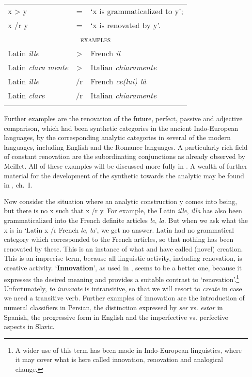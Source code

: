 \begin{table}
	\begin{tabular}{lcl}
		\lsptoprule
		x {\textgreater} y & = & ‘x is grammaticalized to y’;\\
		x /r y & = & ‘x is renovated by y’.\\
		\midrule
		\multicolumn{3}{c}{\textsc{examples}}\\
		Latin \textit{ille} &       {\textgreater} &  French \textit{il}\\
		Latin \textit{clara mente} & {\textgreater} &  Italian \textit{chiaramente}\\
		Latin \textit{ille}    &    /r & French \textit{ce(lui) là}\\
		Latin \textit{clare}   &   /r & Italian \textit{chiaramente}\\
		\lspbottomrule
	\end{tabular}
\end{table}	

Further examples are the renovation of the future, perfect, passive and adjective comparison, which had been synthetic categories in the ancient Indo-European languages, by the corresponding analytic categories in several of the modern languages, including English and the Romance languages. A particularly rich field of constant renovation are the subordinating conjunctions as already observed by Meillet. All of these examples will be discussed more fully in . A wealth of further material for the development of the synthetic towards the analytic may be found in \citet{Tauli1966}, ch.~I.

Now consider the situation where an analytic construction y comes into being, but there is no x such that x /r y. For example, the Latin \textit{ille}, \textit{illa} has also been grammaticalized into the French definite articles \textit{le}, \textit{la}. But when we ask what the x is in ‘Latin x /r French \textit{le}, \textit{la}’, we get no answer. Latin had no grammatical category which corresponded to the French articles, so that nothing has been renovated by these. This is an instance of what \citet{Meillet1915f} and \citet{Traugott1980} have called (novel) creation. This is an imprecise term, because all linguistic activity, including renovation, is creative activity. ‘\textbf{Innovation}’, as used in \citet{Benveniste1968}, seems to be a better one, because it expresses the desired meaning and provides a suitable contrast to ‘renovation’.\footnote{A wider use of this term has been made in Indo-European linguistics, where it may cover what is here called innovation, renovation and analogical change.} Unfortunately, \textit{to innovate }is intransitive, so that we will resort to \textit{create} in case we need a transitive verb. Further examples of innovation are the introduction of numeral classifiers in Persian, the distinction expressed by \textit{ser} vs. \textit{estar} in Spanish, the progressive form in English and the imperfective vs. perfective aspects in Slavic.

